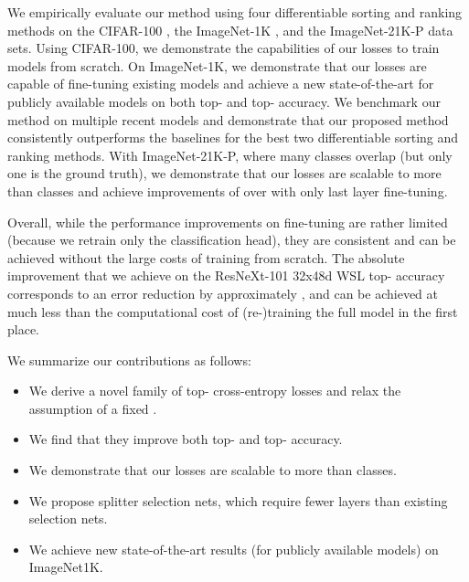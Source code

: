 \documentclass{article}
\begin{document}
We empirically evaluate our method using four differentiable sorting and ranking methods on the CIFAR-100 \citep{Krizhevsky2009_cifar10}, the ImageNet-1K \citep{deng2009imagenet}, and the ImageNet-21K-P \citep{ridnik2021imagenet} data sets.
Using CIFAR-100, we demonstrate the capabilities of our losses to train models from scratch.
On ImageNet-1K, we demonstrate that our losses are capable of fine-tuning existing models and achieve a new state-of-the-art for publicly available models on both top- and top- accuracy.
We benchmark our method on multiple recent models and demonstrate that our proposed method consistently outperforms the baselines for the best two differentiable sorting and ranking methods.
With ImageNet-21K-P, where many classes overlap (but only one is the ground truth), we demonstrate that our losses are scalable to more than  classes and achieve improvements of over  with only last layer fine-tuning.

Overall, while the performance improvements on fine-tuning are rather limited (because we retrain only the classification head), they are consistent and can be achieved without the large costs of training from scratch.
The absolute  improvement that we achieve on the ResNeXt-101 32x48d WSL top- accuracy corresponds to an error reduction by approximately , and can be achieved at much less than 
the computational cost of (re-)training the full model in the first place.  





We summarize our contributions as follows:
\vspace*{-.45em}
\begin{itemize}
\setlength{\itemindent}{-1.em}
\itemsep0pt
    \item We derive a novel family of top- cross-entropy losses and relax the assumption of a fixed .
    \item We find that they improve both top- and top- accuracy.
    \item We demonstrate that our losses are scalable to more than  classes.
    \item We propose splitter selection nets, which require fewer layers than existing selection nets.
    \item We achieve new state-of-the-art results (for publicly available models) on ImageNet1K.
\end{itemize}
\vspace*{-.5em}
\end{document}
